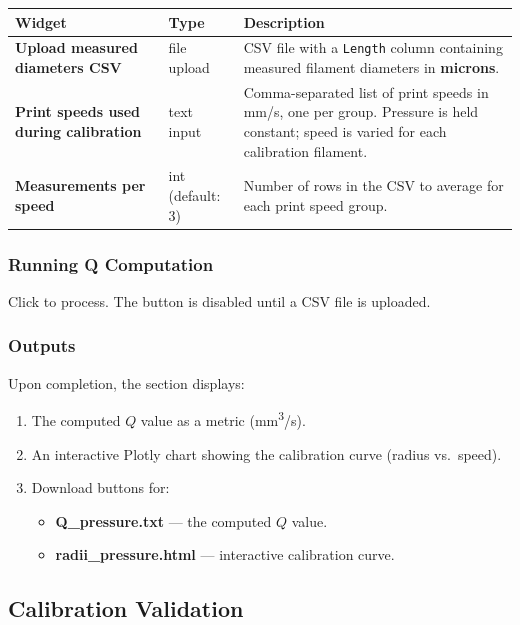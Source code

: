 \documentclass[11pt,letterpaper]{article}
\newcommand{\code}[1]{\texttt{#1}}
\newcommand{\gui}[1]{\textcolor{guicolor}{\textsf{\textbf{#1}}}}
\newcommand{\btn}[1]{\fbox{\textsf{#1}}}
\begin{document}
\begin{tabularx}{\textwidth}{L{3.5cm} l X}
\toprule
\textbf{Widget} & \textbf{Type} & \textbf{Description} \\
\midrule
\gui{Upload measured diameters CSV} & file upload & CSV file with a \code{Length} column containing measured filament diameters in \textbf{microns}. \\
\gui{Print speeds used during calibration} & text input & Comma-separated list of print speeds in mm/s, one per group. Pressure is held constant; speed is varied for each calibration filament. \\
\gui{Measurements per speed} & int (default: 3) & Number of rows in the CSV to average for each print speed group. \\
\bottomrule
\end{tabularx}

\subsubsection{Running Q Computation}

Click \btn{Compute Q} to process. The button is disabled until a CSV file is
uploaded.

\subsubsection{Outputs}

Upon completion, the section displays:

\begin{enumerate}[leftmargin=*]
    \item The computed $Q$ value as a metric (mm\textsuperscript{3}/s).
    \item An interactive Plotly chart showing the calibration curve (radius vs.\ speed).
    \item Download buttons for:
    \begin{itemize}[nosep]
        \item \textbf{Q\_pressure.txt} --- the computed $Q$ value.
        \item \textbf{radii\_pressure.html} --- interactive calibration curve.
    \end{itemize}
\end{enumerate}

\subsection{Calibration Validation}
\end{document}
